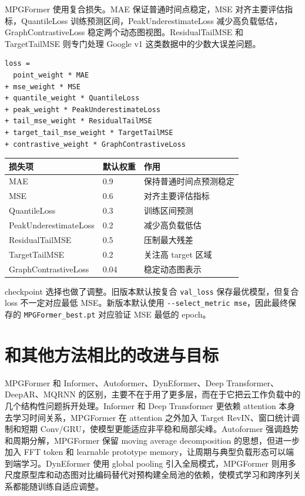 \documentclass[UTF8,a4paper,11pt]{ctexart}
\begin{document}
MPGFormer 使用复合损失。MAE 保证普通时间点稳定，MSE 对齐主要评估指标，QuantileLoss 训练预测区间，PeakUnderestimateLoss 减少高负载低估，GraphContrastiveLoss 稳定两个动态图视图。ResidualTailMSE 和 TargetTailMSE 则专门处理 Google v1 这类数据中的少数大误差问题。

\begin{lstlisting}
loss =
  point_weight * MAE
+ mse_weight * MSE
+ quantile_weight * QuantileLoss
+ peak_weight * PeakUnderestimateLoss
+ tail_mse_weight * ResidualTailMSE
+ target_tail_mse_weight * TargetTailMSE
+ contrastive_weight * GraphContrastiveLoss
\end{lstlisting}

\begin{longtable}{lll}
\toprule
损失项 & 默认权重 & 作用 \\
\midrule
MAE & 0.9 & 保持普通时间点预测稳定 \\
MSE & 0.6 & 对齐主要评估指标 \\
QuantileLoss & 0.3 & 训练区间预测 \\
PeakUnderestimateLoss & 0.2 & 减少高负载低估 \\
ResidualTailMSE & 0.5 & 压制最大残差 \\
TargetTailMSE & 0.2 & 关注高 target 区域 \\
GraphContrastiveLoss & 0.04 & 稳定动态图表示 \\
\bottomrule
\end{longtable}

checkpoint 选择也做了调整。旧版本默认按复合 \verb|val_loss| 保存最优模型，但复合 loss 不一定对应最低 MSE。新版本默认使用 \verb|--select_metric mse|，因此最终保存的 \verb|MPGFormer_best.pt| 对应验证 MSE 最低的 epoch。

\section{和其他方法相比的改进与目标}

MPGFormer 和 Informer、Autoformer、DynEformer、Deep Transformer、DeepAR、MQRNN 的区别，主要不在于用了更多层，而在于它把云工作负载中的几个结构性问题拆开处理。Informer 和 Deep Transformer 更依赖 attention 本身去学习时间关系，MPGFormer 在 attention 之外加入 Target RevIN、窗口统计调制和短期 Conv/GRU，使模型更能适应非平稳和局部尖峰。Autoformer 强调趋势和周期分解，MPGFormer 保留 moving average decomposition 的思想，但进一步加入 FFT token 和 learnable prototype memory，让周期与典型负载形态可以端到端学习。DynEformer 使用 global pooling 引入全局模式，MPGFormer 则用多尺度原型库和动态图对比编码替代对预构建全局池的依赖，使模式学习和跨序列关系都能随训练自适应调整。
\end{document}
